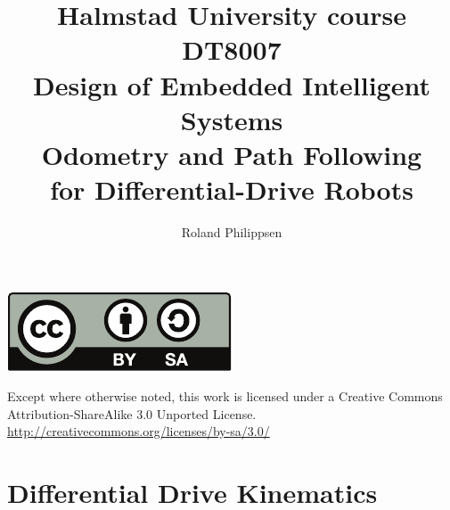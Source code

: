 \documentclass{beamer}
\title[Odometry and Path Following]{%
  \normalsize
  Halmstad University course DT8007\\
  Design of Embedded Intelligent Systems\\[2\baselineskip]
  \Large
  \textbf{Odometry and Path Following}\\
  for Differential-Drive Robots}
\author{Roland Philippsen}
\institute{Halmstad University}
\begin{document}
\begin{frame}[plain]
  \titlepage
  \vfill
  \begin{minipage}{\columnwidth}
    \centering
    \begin{minipage}{0.15\columnwidth}
      \includegraphics[width=\columnwidth]{by-sa.pdf}
    \end{minipage}
    \hspace{1mm}
    \begin{minipage}{0.7\columnwidth}
      \tiny
      Except where otherwise noted,
      this work is licensed under a Creative Commons Attribution-ShareAlike 3.0 Unported License.
      \url{http://creativecommons.org/licenses/by-sa/3.0/}
    \end{minipage}
  \end{minipage}
\end{frame}



\part{Differential Drive Kinematics}

\begin{frame}
  \partpage
  \tableofcontents
\end{frame}
\end{document}
